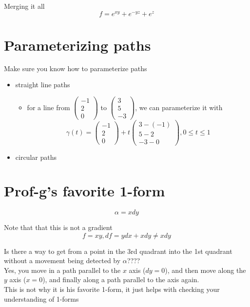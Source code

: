 Merging it all
\[
   f = e^{xy} + e^{-yz} + e^z
\] 

\section{Parameterizing paths}

Make sure you know how to parameterize paths
\begin{itemize}
   \item straight line paths
      \begin{itemize}
         \item for a line from $ \begin{pmatrix} -1 \\ 2 \\ 0 \end{pmatrix} $ to $ \begin{pmatrix}  3 \\ 5 \\ -3 \end{pmatrix} $, we can parameterize it with
            \[
              \gamma(t) = \begin{pmatrix} -1 \\ 2 \\ 0 \end{pmatrix} + t \begin{pmatrix}  3 - (-1) \\ 5 - 2 \\ -3 - 0 \end{pmatrix} , 0 \leq t \leq 1
            \] 
      \end{itemize}
   \item circular paths
\end{itemize}


\section{Prof-g's favorite 1-form}
\[
  \alpha = xdy
\] 

Note that that this is not a gradient
\[
  f = xy, df = ydx + xdy \neq xdy
\] 
 
Is there a way to get from a point in the 3rd quadrant into the 1st quadrant without a movement being detected by  $\alpha$???? \\

Yes, you move in a path parallel to the $x$ axis ($dy = 0$), and then move along the  $y$ axis ($x = 0$), and finally along a path parallel to the axis again. \\

This is not why it is his favorite 1-form, it just helps with checking your understanding of 1-forms






